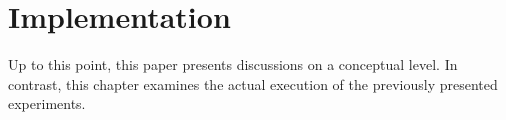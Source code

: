 \chapter{Implementation}
\label{ch:implementation}


Up to this point, this paper presents discussions on a conceptual level. In contrast, this chapter examines the actual execution of the previously presented experiments.

